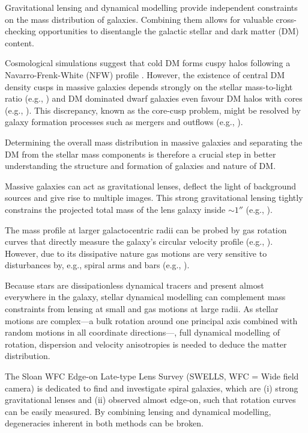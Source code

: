 \documentclass[useAMS,usenatbib]{mnras}
\begin{document}
Gravitational lensing and dynamical modelling provide independent constraints on the mass distribution of galaxies. Combining them allows for valuable cross-checking opportunities to disentangle the galactic stellar and dark matter (DM) content.

Cosmological simulations suggest that cold DM forms cuspy halos following a Navarro-Frenk-White (NFW) profile \citep{1996ApJ...462..563N}. However, the existence of central DM density cusps in massive galaxies depends strongly on the stellar mass-to-light ratio (e.g., \citealt{2011MNRAS.416..322D}) and DM dominated dwarf galaxies even favour DM halos with cores (e.g., \citealt{1994Natur.370..629M,2001ApJ...552L..23D}). This discrepancy, known as the core-cusp problem, might be resolved by galaxy formation processes such as mergers and outflows (e.g., \citealt{2001ApJ...560..636E,2012MNRAS.421.3464P}).

Determining the overall mass distribution in massive galaxies and separating the DM from the stellar mass components is therefore a crucial step in better understanding the structure and formation of galaxies and nature of DM.

Massive galaxies can act as gravitational lenses, deflect the light of background sources and give rise to multiple images. This strong gravitational lensing tightly constrains the projected total mass of the lens galaxy inside $\sim 1''$ (e.g., \citealt{2010ARA&A..48...87T}). 

The mass profile at larger galactocentric radii can be probed by gas rotation curves that directly measure the galaxy's circular velocity profile (e.g., \citealt{1980ApJ...238..471R}). However, due to its dissipative nature gas motions are very sensitive to disturbances by, e.g., spiral arms and bars (e.g., \citealt{2004dad..book.....S}). 

Because stars are dissipationless dynamical tracers and present almost everywhere in the galaxy, stellar dynamical modelling can complement mass constraints from lensing at small and gas motions at large radii. As stellar motions are complex---a bulk rotation around one principal axis combined with random motions in all coordinate directions---\citep{2008gady.book.....B}, full dynamical modelling of rotation, dispersion and velocity anisotropies is needed to deduce the matter distribution.

The Sloan WFC Edge-on Late-type Lens Survey (SWELLS, WFC = Wide field camera) \citep{SWELLSI,SWELLSII,SWELLSIII,SWELLSIV,SWELLSV,SWELLSVI} is dedicated to find and investigate spiral galaxies, which are (i) strong gravitational lenses and (ii) observed almost edge-on, such that rotation curves can be easily measured. By combining lensing and dynamical modelling, degeneracies inherent in both methods can be broken.
\end{document}

